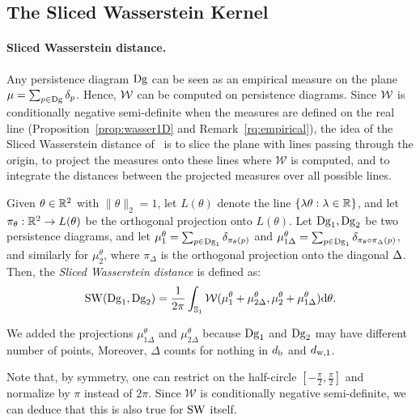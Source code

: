 \subsection{The Sliced Wasserstein Kernel}\label{sec:SWK}

\paragraph*{Sliced Wasserstein distance.} 
Any persistence diagram $\mathrm{Dg}$ can be seen as an empirical measure on the plane $\mu=\sum_{p\in\mathrm{Dg}}\delta_p$.
Hence, $\mathcal W$ can be computed on persistence diagrams. Since $\mathcal W$ is conditionally negative semi-definite 
when the measures are defined on the real line (Proposition~\ref{prop:wasser1D} and Remark~\ref{rq:empirical}), 
the idea of the Sliced Wasserstein distance of~\cite{Rabin11} is
to slice the plane with lines passing through the origin, to
project the measures onto these lines where $\mathcal W$ is computed, 
and to integrate the distances between the projected measures over all possible lines. 
 

\begin{defin}  
Given $\theta\in\mathbb{R}^2$ with $\|\theta\|_2=1$, let $L(\theta)$ denote the line $\{\lambda\theta : \lambda\in\mathbb{R}\}$, and
let $\pi_\theta:\mathbb{R}^2\rightarrow L(\theta)$ be the orthogonal projection onto $L(\theta)$.
Let $\mathrm{Dg}_1,\mathrm{Dg}_2$ be two persistence diagrams, and let $\mu_1^\theta=\sum_{p\in \mathrm{Dg}_1}\delta_{\pi_\theta(p)}$ and 
$\mu_{1\Delta}^\theta=\sum_{p\in \mathrm{Dg}_1}\delta_{\pi_\theta\circ\pi_\Delta(p)}$,
and similarly for $\mu_2^\theta$, where $\pi_\Delta$ is the orthogonal projection onto the diagonal $\Delta$.
Then, the {\em Sliced Wasserstein distance} 
is defined as:
$${\rm SW}(\mathrm{Dg}_1,\mathrm{Dg}_2)=\frac{1}{2\pi}\int_{\mathbb{S}_1} \mathcal W(\mu_1^\theta+\mu_{2\Delta}^\theta,\mu_2^\theta+\mu_{1\Delta}^\theta){\rm d}\theta.$$
\end{defin} 

We added the projections $\mu_{1\Delta}^\theta$ and $\mu_{2\Delta}^\theta$ because $\mathrm{Dg}_1$ and $\mathrm{Dg}_2$ may have different number of points,
Moreover, $\Delta$ counts for nothing in $d_{\rm b}$ and $d_{{\rm w},1}$.

Note that, by symmetry, one can restrict on the half-circle $[-\frac\pi2,\frac\pi2]$ and normalize by $\pi$ instead of $2\pi$.
Since $\mathcal W$ is conditionally negative semi-definite,
we can deduce that this is also true for ${\rm SW}$ itself. %

